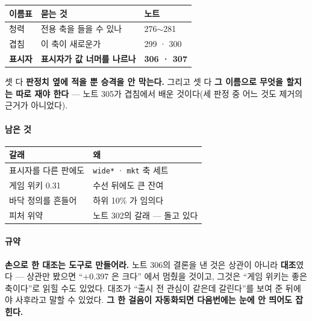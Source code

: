 \documentclass[10pt]{article}
\begin{document}
\begin{center}\footnotesize
\begin{tabular}{lll}
\hline
이름표 & 묻는 것 & 노트 \\
\hline
청력 & 전용 축을 들을 수 있나 & 276$\sim$281 \\
겹침 & 이 축이 새로운가 & 299 · 300 \\
\textbf{표시자} & \textbf{표시자가 값 너머를 나르나} & \textbf{306 · 307} \\
\hline
\end{tabular}
\end{center}

셋 다 \textbf{판정치 옆에 적을 뿐 승격을 안 막는다.} 그리고 셋 다
\textbf{그 이름으로 무엇을 할지는 따로 재야 한다} --- 노트 305가 겹침에서
배운 것이다(세 판정 중 어느 것도 제거의 근거가 아니었다).

\paragraph{남은 것}
\begin{center}\small
\begin{tabular}{ll}
\hline
갈래 & 왜 \\
\hline
표시자를 다른 판에도 & \texttt{wide*} · \texttt{mkt} 축 세트 \\
게임 위키 0.31 & 수선 뒤에도 큰 잔여 \\
바닥 정의를 흔들어 & 하위 10\% 가 임의다 \\
피처 위약 & 노트 302의 갈래 --- 돌고 있다 \\
\hline
\end{tabular}
\end{center}

\paragraph{규약} \textbf{손으로 한 대조는 도구로 만들어라.} 노트 306의
결론을 낸 것은 상관이 아니라 \textbf{대조}였다 --- 상관만 봤으면
``$+$0.397 은 크다'' 에서 멈췄을 것이고, 그것은 ``게임 위키는 좋은 축이다''로
읽힐 수도 있었다. 대조가 ``출시 전 관심이 같은데 갈린다''를 보여 준 뒤에야
사후라고 말할 수 있었다. \textbf{그 한 걸음이 자동화되면 다음번에는
눈에 안 띄어도 잡힌다.}
\end{document}
